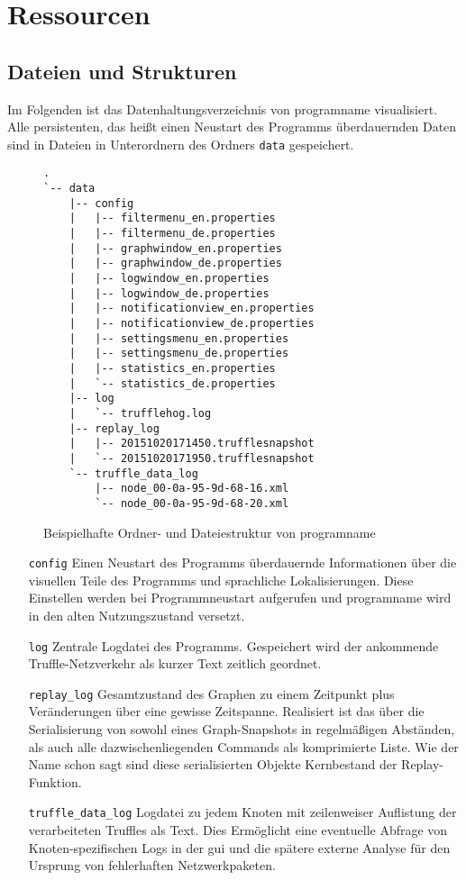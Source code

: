 \chapter{Ressourcen}
\section{Dateien und Strukturen}
Im Folgenden ist das Datenhaltungsverzeichnis von \gls{programname} visualisiert. Alle persistenten, das heißt einen Neustart des Programms überdauernden Daten sind in Dateien in Unterordnern des Ordners \texttt{data} gespeichert.
\begin{figure}[htb]
  \centering
\begin{verbatim}
.
`-- data
    |-- config
    |   |-- filtermenu_en.properties
    |   |-- filtermenu_de.properties
    |   |-- graphwindow_en.properties
    |   |-- graphwindow_de.properties
    |   |-- logwindow_en.properties
    |   |-- logwindow_de.properties
    |   |-- notificationview_en.properties
    |   |-- notificationview_de.properties
    |   |-- settingsmenu_en.properties
    |   |-- settingsmenu_de.properties
    |   |-- statistics_en.properties
    |   `-- statistics_de.properties
    |-- log
    |   `-- trufflehog.log
    |-- replay_log
    |   |-- 20151020171450.trufflesnapshot
    |   `-- 20151020171950.trufflesnapshot
    `-- truffle_data_log
        |-- node_00-0a-95-9d-68-16.xml
        `-- node_00-0a-95-9d-68-20.xml
\end{verbatim}
  \caption[Ordner- und Dateiestruktur von \gls{programname}]{Beispielhafte Ordner- und Dateiestruktur von \gls{programname}}
\end{figure}

\begin{itemize}
\item[\texttt{config}] Einen Neustart des Programms überdauernde Informationen über die visuellen Teile des Programms und sprachliche Lokalisierungen. Diese Einstellen werden bei Programmneustart aufgerufen und \gls{programname} wird in den alten Nutzungszustand versetzt.
\item[\texttt{log}] Zentrale Logdatei des Programms. Gespeichert wird der ankommende Truffle-Netzverkehr als kurzer Text zeitlich geordnet.
\item[\texttt{replay\_log}] Gesamtzustand des Graphen zu einem Zeitpunkt plus Veränderungen über eine gewisse Zeitspanne. Realisiert ist das über die Serialisierung von sowohl eines Graph-Snapshots in regelmäßigen Abständen, als auch alle dazwischenliegenden Commands als komprimierte Liste. Wie der Name schon sagt sind diese serialisierten Objekte Kernbestand der Replay-Funktion.
\item[\texttt{truffle\_data\_log}] Logdatei zu jedem Knoten mit zeilenweiser Auflistung der verarbeiteten Truffles als Text. Dies Ermöglicht eine eventuelle Abfrage von Knoten-spezifischen Logs in der \gls{gui} und die spätere externe Analyse für den Ursprung von fehlerhaften Netzwerkpaketen.
\end{itemize}

